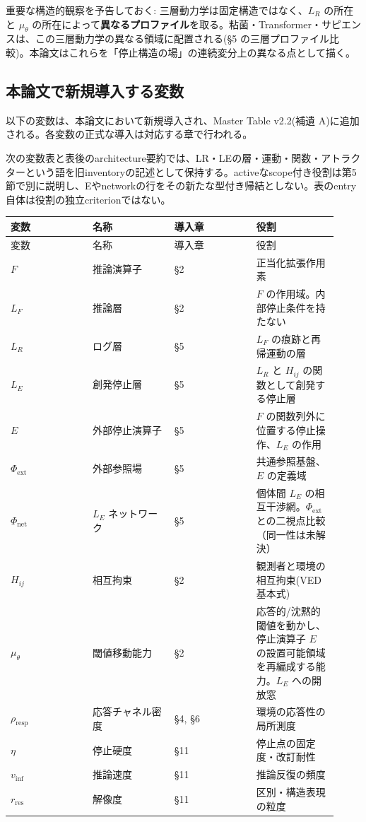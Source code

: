 重要な構造的観察を予告しておく: 三層動力学は固定構造ではなく、$L_R$ の所在と $\mu_\theta$ の所在によって\textbf{異なるプロファイル}を取る。粘菌・Transformer・サピエンスは、この三層動力学の異なる領域に配置される(\S{}5 の三層プロファイル比較)。本論文はこれらを「停止構造の場」の連続変分上の異なる点として描く。

\bigskip


\subsection{本論文で新規導入する変数}


以下の変数は、本論文において新規導入され、Master Table v2.2(補遺 A)に追加される。各変数の正式な導入は対応する章で行われる。

次の変数表と表後のarchitecture要約では、LR・LEの層・運動・関数・アトラクターという語を旧inventoryの記述として保持する。activeなscope付き役割は第5節で別に説明し、Eやnetworkの行をその新たな型付き帰結としない。表のentry自体は役割の独立criterionではない。

\begin{longtable}{@{}p{0.23\linewidth}p{0.23\linewidth}p{0.23\linewidth}p{0.23\linewidth}@{}}
\toprule
変数 & 名称 & 導入章 & 役割 \\
\midrule
\endfirsthead
\toprule
変数 & 名称 & 導入章 & 役割 \\
\midrule
\endhead
$F$ & 推論演算子 & \S{}2 & 正当化拡張作用素 \\
$L_F$ & 推論層 & \S{}2 & $F$ の作用域。内部停止条件を持たない \\
$L_R$ & ログ層 & \S{}5 & $L_F$ の痕跡と再帰運動の層 \\
$L_E$ & 創発停止層 & \S{}5 & $L_R$ と $H_{ij}$ の関数として創発する停止層 \\
$E$ & 外部停止演算子 & \S{}5 & $F$ の関数列外に位置する停止操作、$L_E$ の作用 \\
$\Phi_{\text{ext}}$ & 外部参照場 & \S{}5 & 共通参照基盤、$E$ の定義域 \\
$\Phi_{\text{net}}$ & $L_E$ ネットワーク & \S{}5 & 個体間 $L_E$ の相互干渉網。$\Phi_{\text{ext}}$ との二視点比較（同一性は未解決） \\
$H_{ij}$ & 相互拘束 & \S{}2 & 観測者と環境の相互拘束(VED 基本式) \\
$\mu_\theta$ & 閾値移動能力 & \S{}2 & 応答的/沈黙的閾値を動かし、停止演算子 $E$ の設置可能領域を再編成する能力。$L_E$ への開放窓 \\
$\rho_{\text{resp}}$ & 応答チャネル密度 & \S{}4, \S{}6 & 環境の応答性の局所測度 \\
$\eta$ & 停止硬度 & \S{}11 & 停止点の固定度・改訂耐性 \\
$v_{\text{inf}}$ & 推論速度 & \S{}11 & 推論反復の頻度 \\
$r_{\text{res}}$ & 解像度 & \S{}11 & 区別・構造表現の粒度 \\
\bottomrule
\end{longtable}


